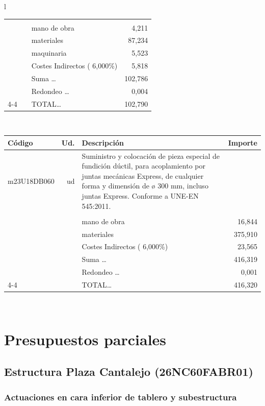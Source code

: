 \documentclass{book}%
\begin{document}
\begin{longtable}{l}
\begin{tabular}{l r p{60mm} r}
&&&\\%
&&mano de obra&     4,211\\%
&&materiales&    87,234\\%
&&maquinaria&     5,523\\%
&&Costes Indirectos (     6,000\%)&     5,818\\%
&&Suma \ldots&   102,786\\%
&&Redondeo \ldots&     0,004\\%
\cline{4-4}%
&&TOTAL\ldots&   102,790\\%
\end{tabular}\\%
\begin{tabular}{l r p{60mm} r}%
Código&Ud.&Descripción&Importe\\%
\hline%
m23U18DB060&ud&Suministro y colocación de pieza especial de fundición dúctil, para acoplamiento por juntas mecánicas Express, de cualquier forma y dimensión de ø 300 mm, incluso juntas Express. Conforme a UNE{-}EN 545:2011.&\\%
&&&\\%
&&mano de obra&    16,844\\%
&&materiales&   375,910\\%
&&Costes Indirectos (     6,000\%)&    23,565\\%
&&Suma \ldots&   416,319\\%
&&Redondeo \ldots&     0,001\\%
\cline{4-4}%
&&TOTAL\ldots&   416,320\\%
\end{tabular}\\%
\end{longtable}%
\normalsize%


%
\part{Presupuestos parciales}%
\chapter{Estructura Plaza Cantalejo (26NC60FABR01)}%
\section{Actuaciones en cara inferior de tablero y subestructura}%
\end{document}
